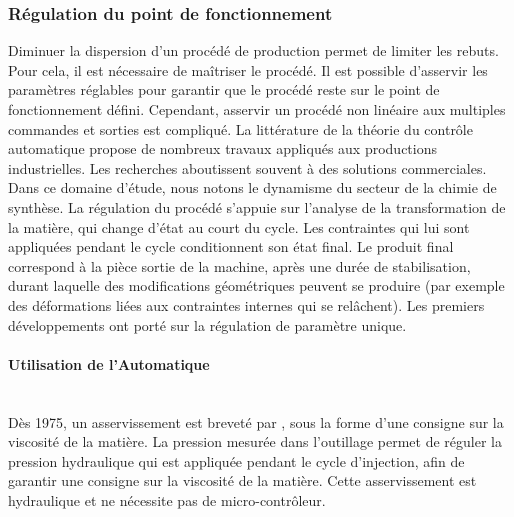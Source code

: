 \subsubsection{Régulation du point de fonctionnement}
Diminuer la dispersion d’un procédé de production permet de limiter les rebuts.
Pour cela, il est nécessaire de maîtriser le procédé.
Il est possible d’asservir les paramètres réglables pour garantir que le procédé reste sur le point de fonctionnement défini.
Cependant, asservir un procédé non linéaire aux multiples commandes et sorties est compliqué.
La littérature de la théorie du contrôle automatique propose de nombreux travaux appliqués aux productions industrielles.
Les recherches aboutissent souvent à des solutions commerciales.
Dans ce domaine d'étude, nous notons le dynamisme du secteur de la chimie de synthèse.
La régulation du procédé s'appuie sur l'analyse de la transformation de la matière, qui change d'état au court du cycle.
Les contraintes qui lui sont appliquées pendant le cycle conditionnent son état final.
Le produit final correspond à la pièce sortie de la machine, après une durée de stabilisation, durant laquelle des modifications géométriques peuvent se produire (par exemple des déformations liées aux contraintes internes qui se relâchent).
Les premiers développements ont porté sur la régulation de paramètre unique.

\paragraph{Utilisation de l'Automatique}\mbox{} \\
Dès 1975, un asservissement est breveté par \cite{laczko_controller_1975}, sous la forme d'une consigne sur la viscosité de la matière.
La pression mesurée dans l'outillage permet de réguler la pression hydraulique qui est appliquée pendant le cycle d'injection, afin de garantir une consigne sur la viscosité de la matière.
Cette asservissement est hydraulique et ne nécessite pas de micro-contrôleur.

